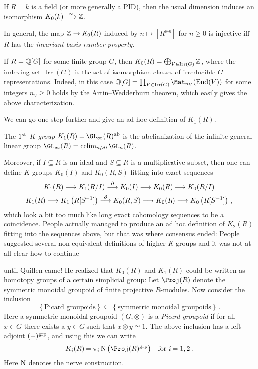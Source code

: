 	\begin{exm}
		\begin{alphanumerate}
			\item If $R=k$ is a field (or more generally a PID), then the usual dimension induces an isomorphism $K_0(k)\isomorphism\IZ$.
			\item In general, the map $\mathbb{Z}\rightarrow K_0(R)$ induced by $n\mapsto [R^{\oplus n}]$ for $n\geq0$ is injective iff $R$ has the \emph{invariant basis number property}.
			\item If $R=\mathbb{Q}[G]$ for some finite group $G$, then $K_0(R)=\bigoplus_{V\in \operatorname{Irr}(G)}\mathbb{Z}$, where the indexing set $\operatorname{Irr}(G)$ is the set of isomorphism classes of irreducible $G$-representations. Indeed, in this case $\IQ[G]=\prod_{V\in\operatorname{Irr}(G)}\Mat_{n_V}(\End(V))$ for some integers $n_V\geq 0$ holds by the Artin--Wedderburn theorem, which easily gives the above characterization.
		\end{alphanumerate}
	\end{exm}
	We can go one step further and give an ad hoc definition of $K_1(R)$.
	\begin{defi}\label{def:K1R}
		The \emph{$1^{\text{st}}$ $K$-group} $K_1(R)=\GL_\infty(R)^\ab$ is the abelianization of the infinite general linear group $\GL_\infty(R)=\colimit_{n\geq 0}\GL_n(R)$.
	\end{defi}
	Moreover, if $I\subseteq R$ is an ideal and $S\subseteq R$ is a multiplicative subset, then one can define $K$-groups $K_0(I)$ and $K_0(R,S)$ fitting into exact sequences
	\begin{gather*}
		K_1(R)\morphism K_1(R/I)\morphism[\partial]K_0(I)\morphism K_0(R)\morphism K_0(R/I)\\
		K_1(R)\morphism K_1\left(R[S^{-1}]\right)\morphism[\partial]K_0(R,S)\morphism K_0(R)\morphism K_0\left(R[S^{-1}]\right)\,,
	\end{gather*}
	which look a bit too much like long exact cohomology sequences to be a coincidence. People actually managed to produce an ad hoc definition of $K_2(R)$ fitting into the sequences above, but that was where consensus ended: People suggested several non-equivalent definitions of higher $K$-groups and it was not at all clear how to continue \dotso 
	
	\dotso until Quillen came! He realized that $K_0(R)$ and $K_1(R)$ could be written as homotopy groups of a certain simplicial group: Let $\Proj (R)$ denote the symmetric monoidal groupoid of finite projective $R$-modules. Now consider the inclusion
	\begin{equation*}
		\left\{\text{Picard groupoids}\right\}\subseteq \left\{\text{symmetric monoidal groupoids}\right\}\,.
	\end{equation*}
	Here a symmetric monoidal groupoid $(G,\otimes)$ is a \emph{Picard groupoid} if for all $x\in G$ there exists a $y\in G$ such that $x\otimes y\simeq 1$. The above inclusion has a left adjoint $(-)^{\mathrm{grp}}$, and using this we can write
	\begin{equation*}
		K_i(R)=\pi_i\N\big(\Proj (R)^\grp\big)\quad\text{for }i=1,2\,.
	\end{equation*}
	Here $\operatorname{N}$ denotes the nerve construction.


